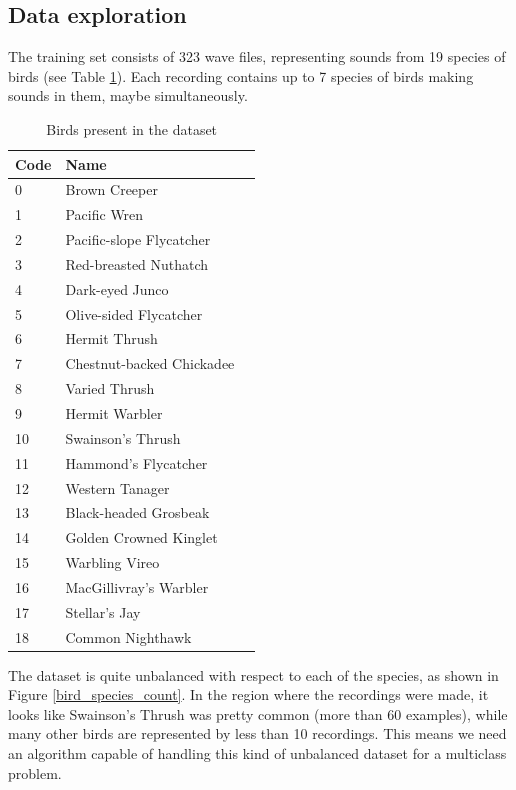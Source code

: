 \documentclass[11pt]{article}
\begin{document}
\subsection{Data exploration}

The training set consists of 323 wave files, representing sounds from 19 species of birds (see Table \ref{bird_name_table}). Each recording contains up to 7 species of birds making sounds in them, maybe simultaneously.

\begin{table}[h]
\centering
\caption{Birds present in the dataset}
\label{bird_name_table}
\begin{tabular}{|l|l|l|}
\hline
Code & Name                       \\ \hline\hline
0    & Brown Creeper              \\ \hline
1    & Pacific Wren                \\ \hline
2    & Pacific-slope Flycatcher    \\ \hline
3    & Red-breasted Nuthatch       \\ \hline
4    & Dark-eyed Junco             \\ \hline
5    & Olive-sided Flycatcher      \\ \hline
6    & Hermit Thrush               \\ \hline
7    & Chestnut-backed Chickadee   \\ \hline
8    & Varied Thrush              \\ \hline
9    & Hermit Warbler              \\ \hline
10   & Swainson's Thrush           \\ \hline
11   & Hammond's Flycatcher        \\ \hline
12   & Western Tanager             \\ \hline
13   & Black-headed Grosbeak       \\ \hline
14   & Golden Crowned Kinglet      \\ \hline
15   & Warbling Vireo              \\ \hline
16   & MacGillivray's Warbler      \\ \hline
17   & Stellar's Jay               \\ \hline
18   & Common Nighthawk            \\ \hline
\end{tabular}
\end{table}

The dataset is quite unbalanced with respect to each of the species, as shown in Figure \ref{bird_species_count}. In the region where the recordings were made, it looks like Swainson's Thrush was pretty common (more than 60 examples), while many other birds are represented by less than 10 recordings. This means we need an algorithm capable of handling this kind of unbalanced dataset for a multiclass problem. 
\end{document}
